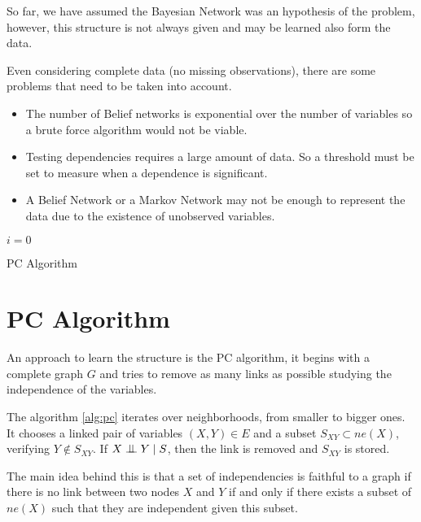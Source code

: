 
So far, we have assumed the Bayesian Network was an hypothesis of the problem, however, this structure is not always given and may be learned also form the data.

Even considering complete data (no missing observations), there are some problems that need to be taken into account.
\begin{itemize}
  \item The number of Belief networks is exponential over the number of
    variables so a brute force algorithm would not be viable.
  \item Testing dependencies requires a large amount of data. So a threshold
    must be set to measure when a dependence is significant.
  \item A Belief Network or a Markov Network may not be enough to represent
    the data due to the existence of unobserved variables.
\end{itemize}


\begin{algorithm}[t]
  \SetAlgoLined
  \(i = 0\)\;
  \caption{PC Algorithm}
  \label{alg:pc}
\end{algorithm}

\section{PC Algorithm}

An approach to learn the structure is the PC algorithm, it begins with a
complete graph \(G\) and tries to remove as many links as possible studying the
independence of the variables.

The algorithm \ref{alg:pc} iterates over neighborhoods, from smaller to bigger ones. It chooses a linked pair of variables \((X,Y) \in E\) and
a subset \(S_{XY} \subset ne(X)\), verifying
\(Y \notin S_{XY}\). If \(X \bigCI Y \mid S\), then the link is removed and
\(S_{XY}\) is stored.

The main idea behind this is that a set of independencies is
faithful to a graph if there is no link between two nodes \(X\) and \(Y\) if
and only if there exists a subset of \(ne(X)\) such that they are independent
given this subset.

